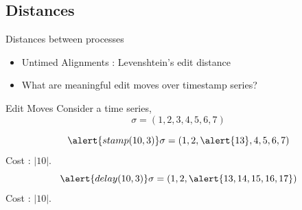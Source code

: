 \documentclass[10pt]{beamer}
\begin{document}
\subsection{Distances}
\begin{frame}{Distances between processes}
    \begin{itemize}
        \item Untimed Alignments : Levenshtein's edit distance 
        \vfill 
        \item \alert{What are meaningful edit moves over timestamp series?}
        \vfill 
    \end{itemize}
\end{frame}

\begin{frame}{Edit Moves}
	Consider a time series, \alert{$$\sigma = (1, 2, 3, 4, 5, 6, 7)$$}
	
    $$\alert{stamp(10, 3)}\sigma = (1, 2, \alert{13}, 4, 5, 6, 7)$$
\vfill 
Cost : $|10|$.
	\pause 
	\vfill 
    $$\alert{delay(10, 3)}\sigma = (1, 2, \alert{13, 14, 15, 16, 17})$$
\vfill 
Cost : $|10|$.

\end{frame}
\end{document}
